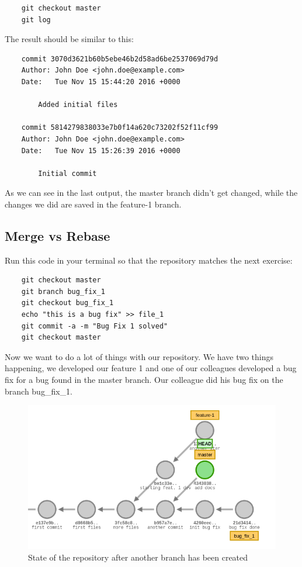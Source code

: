 \documentclass{article}
\begin{document}
\begin{lstlisting}
	git checkout master
	git log
\end{lstlisting}

The result should be similar to this:

\begin{lstlisting}
	commit 3070d3621b60b5ebe46b2d58ad6be2537069d79d
	Author: John Doe <john.doe@example.com>
	Date:   Tue Nov 15 15:44:20 2016 +0000

    	Added initial files

	commit 5814279838033e7b0f14a620c73202f52f11cf99
	Author: John Doe <john.doe@example.com>
	Date:   Tue Nov 15 15:26:39 2016 +0000

    	Initial commit
\end{lstlisting}

As we can see in the last output, the master branch didn't get changed, while the changes we did are saved in the feature-1 branch.\\

\subsection{Merge vs Rebase}

Run this code in your terminal so that the repository matches the next exercise:

\begin{lstlisting}
	git checkout master
	git branch bug_fix_1
	git checkout bug_fix_1
	echo "this is a bug fix" >> file_1
	git commit -a -m "Bug Fix 1 solved"
	git checkout master
\end{lstlisting}

Now we want to do a lot of things with our repository. We have two things happening, we developed our feature 1 and one of our colleagues developed a bug fix for a bug found in the master branch. Our colleague did his bug fix on the branch bug\_fix\_1.\\

\begin{figure}[H]
\centerline{\includegraphics[scale=0.5]{repository_with_3_branches.png}}
\caption{State of the repository after another branch has been created}
\label{fig1}
\end{figure}
\end{document}
